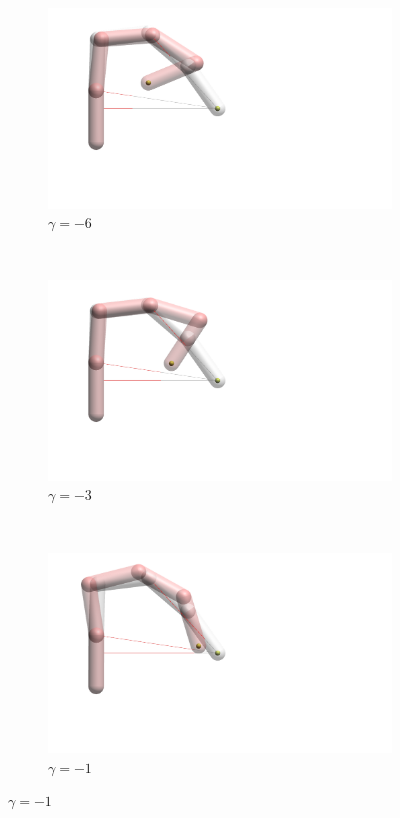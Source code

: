 \begin{figure}[h]
    \centering
    \begin{subfigure}[b]{.3\textwidth}
        \includegraphics[width=\textwidth]{Figures/distortions/distortions-6.png}
        \caption{$\gamma = -6$}
    \end{subfigure}
    ~
    \begin{subfigure}[b]{.3\textwidth}
        \includegraphics[width=\textwidth]{Figures/distortions/distortions-3.png}
        \caption{$\gamma = -3$}
    \end{subfigure}
    ~
    \begin{subfigure}[b]{.3\textwidth}
        \includegraphics[width=\textwidth]{Figures/distortions/distortions-1.png}
        \caption{$\gamma = -1$}
    \end{subfigure}
    

\end{figure}
